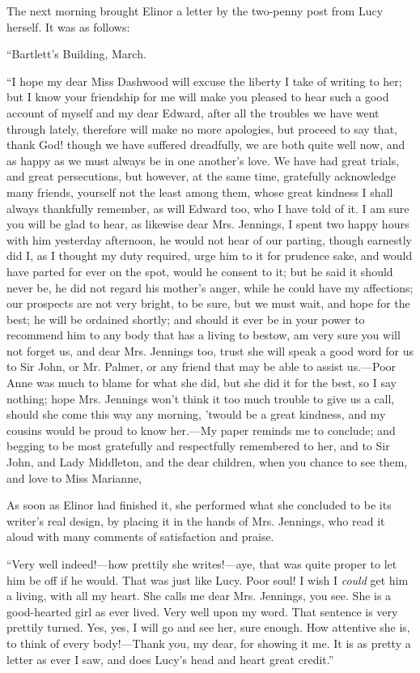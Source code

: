 The next morning brought Elinor a letter by the two-penny post from Lucy herself. It was as follows:

“Bartlett's Building, March.

“I hope my dear Miss Dashwood will excuse the liberty I take of writing to her; but I know your friendship for me will make you pleased to hear such a good account of myself and my dear Edward, after all the troubles we have went through lately, therefore will make no more apologies, but proceed to say that, thank God! though we have suffered dreadfully, we are both quite well now, and as happy as we must always be in one another's love. We have had great trials, and great persecutions, but however, at the same time, gratefully acknowledge many friends, yourself not the least among them, whose great kindness I shall always thankfully remember, as will Edward too, who I have told of it. I am sure you will be glad to hear, as likewise dear Mrs. Jennings, I spent two happy hours with him yesterday afternoon, he would not hear of our parting, though earnestly did I, as I thought my duty required, urge him to it for prudence sake, and would have parted for ever on the spot, would he consent to it; but he said it should never be, he did not regard his mother's anger, while he could have my affections; our prospects are not very bright, to be sure, but we must wait, and hope for the best; he will be ordained shortly; and should it ever be in your power to recommend him to any body that has a living to bestow, am very sure you will not forget us, and dear Mrs. Jennings too, trust she will speak a good word for us to Sir John, or Mr. Palmer, or any friend that may be able to assist us.---Poor Anne was much to blame for what she did, but she did it for the best, so I say nothing; hope Mrs. Jennings won't think it too much trouble to give us a call, should she come this way any morning, 'twould be a great kindness, and my cousins would be proud to know her.---My paper reminds me to conclude; and begging to be most gratefully and respectfully remembered to her, and to Sir John, and Lady Middleton, and the dear children, when you chance to see them, and love to Miss Marianne,


As soon as Elinor had finished it, she performed what she concluded to be its writer's real design, by placing it in the hands of Mrs. Jennings, who read it aloud with many comments of satisfaction and praise.

“Very well indeed!---how prettily she writes!---aye, that was quite proper to let him be off if he would. That was just like Lucy. Poor soul! I wish I {\em could} get him a living, with all my heart. She calls me dear Mrs. Jennings, you see. She is a good-hearted girl as ever lived. Very well upon my word. That sentence is very prettily turned. Yes, yes, I will go and see her, sure enough. How attentive she is, to think of every body!---Thank you, my dear, for showing it me. It is as pretty a letter as ever I saw, and does Lucy's head and heart great credit.”

